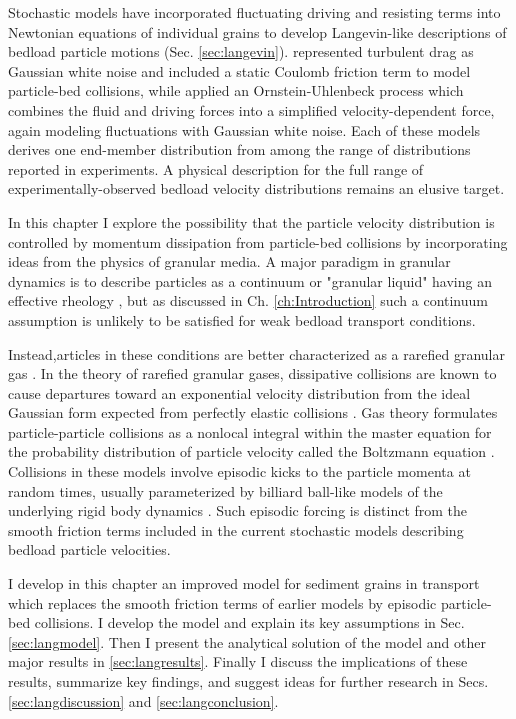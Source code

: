 Stochastic models have incorporated fluctuating driving and resisting terms into Newtonian equations of individual grains to develop Langevin-like descriptions of bedload particle motions (Sec. \ref{sec:langevin}). \citet{Fan2014} represented turbulent drag as Gaussian white noise and included a static Coulomb friction term to model particle-bed collisions, while \citet{Ancey2014} applied an Ornstein-Uhlenbeck process which combines the fluid and driving forces into a simplified velocity-dependent force, again modeling fluctuations with Gaussian white noise.
Each of these models derives one end-member distribution from among the range of distributions reported in experiments.
A physical description for the full range of experimentally-observed bedload velocity distributions remains an elusive target.

In this chapter I explore the possibility that the particle velocity distribution is controlled by momentum dissipation from particle-bed collisions by incorporating ideas from the physics of granular media.
A major paradigm in granular dynamics is to describe particles as a continuum or "granular liquid" having an effective rheology \citep[e.g.][]{Jenkins1998,Andreotti2013}, but as discussed in Ch. \ref{ch:Introduction} such a continuum assumption is unlikely to be satisfied for weak bedload transport conditions. 

Instead,articles in these conditions are better characterized as a rarefied granular gas \citep[e.g.][]{Furbish2021}. 
In the theory of rarefied granular gases, dissipative collisions are known to cause departures toward an exponential velocity distribution from the ideal Gaussian form expected from perfectly elastic collisions \citep{Brilliantov2004}.
Gas theory formulates particle-particle collisions as a nonlocal integral within the master equation for the probability distribution of particle velocity called the Boltzmann equation \citep{Landau1969,Chapman1970,Brilliantov2004}.
Collisions in these models involve episodic kicks to the particle momenta at random times, usually parameterized by billiard ball-like models of the underlying rigid body dynamics \citep[e.g.][]{Brach1989}.
Such episodic forcing is distinct from the smooth friction terms included in the current stochastic models describing bedload particle velocities.

I develop in this chapter an improved model for sediment grains in transport which replaces the smooth friction terms of earlier models by episodic particle-bed collisions.
I develop the model and explain its key assumptions in Sec. \ref{sec:langmodel}. Then I present the analytical solution of the model and other major results in \ref{sec:langresults}. Finally I discuss the implications of these results, summarize key findings, and suggest ideas for further research in Secs. \ref{sec:langdiscussion} and \ref{sec:langconclusion}.


